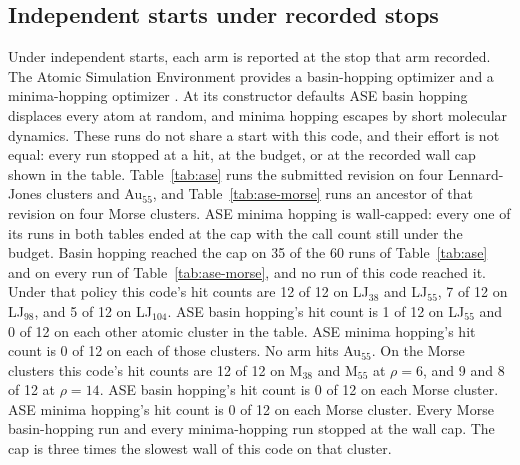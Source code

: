 \documentclass[journal=jctcce,manuscript=article]{achemso}
\begin{document}
\subsection{Independent starts under recorded stops}
\label{sec:ase}
Under independent starts, each arm is reported at the stop that arm recorded.
The Atomic Simulation Environment provides a basin-hopping optimizer and a
minima-hopping optimizer \cite{larsenAse2017,goedecker2004}.
At its constructor defaults ASE basin hopping displaces every atom at random,
and minima hopping escapes by short molecular dynamics.
These runs do not share a start with this code, and their effort is not equal:
every run stopped at a hit, at the budget, or at the recorded wall cap shown
in the table.
Table~\ref{tab:ase} runs the submitted revision on four Lennard-Jones
clusters and Au\(_{55}\), and Table~\ref{tab:ase-morse} runs an ancestor of
that revision on four Morse clusters.
ASE minima hopping is wall-capped: every one of its runs in both tables
ended at the cap with the call count still under the budget.
Basin hopping reached the cap on 35 of the 60 runs of Table~\ref{tab:ase}
and on every run of Table~\ref{tab:ase-morse}, and no run of this code
reached it.
Under that policy this code's hit counts are 12 of 12 on LJ\(_{38}\) and LJ\(_{55}\),
7 of 12 on LJ\(_{98}\), and 5 of 12 on LJ\(_{104}\).
ASE basin hopping's hit count is 1 of 12 on LJ\(_{55}\) and 0 of 12 on each other atomic cluster in the table.
ASE minima hopping's hit count is 0 of 12 on each of those clusters.
No arm hits Au\(_{55}\).
On the Morse clusters this code's hit counts are 12 of 12 on M\(_{38}\) and M\(_{55}\) at
\(\rho=6\), and 9 and 8 of 12 at \(\rho=14\).
ASE basin hopping's hit count is 0 of 12 on each Morse cluster.
ASE minima hopping's hit count is 0 of 12 on each Morse cluster.
Every Morse basin-hopping run and every minima-hopping run stopped at the wall cap.
The cap is three times the slowest wall of this code on that cluster.
\end{document}
